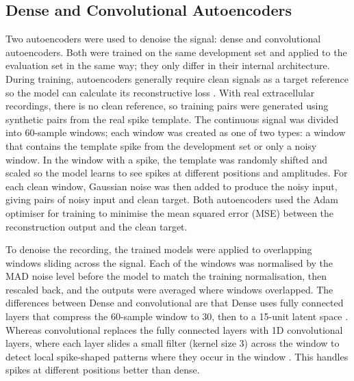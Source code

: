 \documentclass[ %
                    author={Rzan Alkabier},
                    supervisor={Dr. Zahraa Abdallah},
                    degree={MSc},
                     title={Denoising Extracellular Recording for Spike Detection and Classification on Single Channels},
                    subtitle={Does denoising improve detection and classification performance?},
                      type={},
                      year={2026}]{dissertation}
\begin{document}
\subsection{Dense and Convolutional Autoencoders}
Two autoencoders were used to denoise the signal: dense and convolutional autoencoders. Both were trained on the same development set and applied to the evaluation set in the same way; they only differ in their internal architecture. During training, autoencoders generally require clean signals as a target reference so the model can calculate its reconstructive loss \cite{vincent_extracting_2008, kechris_removing_2021}. With real extracellular recordings, there is no clean reference, so training pairs were generated using synthetic pairs from the real spike template. The continuous signal was divided into 60-sample windows; each window was created as one of two types: a window that contains the template spike from the development set or only a noisy window. In the window with a spike, the template was randomly shifted and scaled so the model learns to see spikes at different positions and amplitudes. For each clean window, Gaussian noise was then added to produce the noisy input, giving pairs of noisy input and clean target. Both autoencoders used the Adam optimiser for training to minimise the mean squared error (MSE) between the reconstruction output and the clean target. 
\bigskip

\noindent
To denoise the recording, the trained models were applied to overlapping windows sliding across the signal. Each of the windows was normalised by the MAD noise level before the model to match the training normalisation, then rescaled back, and the outputs were averaged where windows overlapped. 
The differences between Dense and convolutional are that Dense uses fully connected layers that compress the 60-sample window to 30, then to a 15-unit latent space \cite{li_aecuration_2025}. Whereas convolutional replaces the fully connected layers with 1D convolutional layers, where each layer slides a small filter (kernel size 3) across the window to detect local spike-shaped patterns where they occur in the window \cite{kechris_removing_2021, li_accurate_2020}. This handles spikes at different positions better than dense. 
\bigskip
\end{document}
